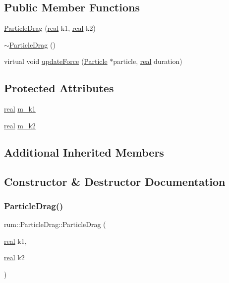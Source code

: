 \subsection*{Public Member Functions}
\begin{DoxyCompactItemize}
\item 
\hyperlink{classrum_1_1_particle_drag_a8489f5c5deb622003656afc4989e71bb}{Particle\+Drag} (\hyperlink{namespacerum_a7e8cca23573d5eaead0f138cbaa4862c}{real} k1, \hyperlink{namespacerum_a7e8cca23573d5eaead0f138cbaa4862c}{real} k2)
\item 
\hyperlink{classrum_1_1_particle_drag_a21072ca38b82529540f361a24cbec508}{$\sim$\+Particle\+Drag} ()
\item 
virtual void \hyperlink{classrum_1_1_particle_drag_ae7fd35504197fc262b2af02da80c148e}{update\+Force} (\hyperlink{classrum_1_1_particle}{Particle} $\ast$particle, \hyperlink{namespacerum_a7e8cca23573d5eaead0f138cbaa4862c}{real} duration)
\end{DoxyCompactItemize}
\subsection*{Protected Attributes}
\begin{DoxyCompactItemize}
\item 
\hyperlink{namespacerum_a7e8cca23573d5eaead0f138cbaa4862c}{real} \hyperlink{classrum_1_1_particle_drag_ad4fcf721667ea70b2ee8ca5ddac9d0ed}{m\+\_\+k1}
\item 
\hyperlink{namespacerum_a7e8cca23573d5eaead0f138cbaa4862c}{real} \hyperlink{classrum_1_1_particle_drag_a30f863703e55b68316c64c6f9a8cc25f}{m\+\_\+k2}
\end{DoxyCompactItemize}
\subsection*{Additional Inherited Members}


\subsection{Constructor \& Destructor Documentation}
\mbox{\label{classrum_1_1_particle_drag_a8489f5c5deb622003656afc4989e71bb}} 
\subsubsection{\texorpdfstring{Particle\+Drag()}{ParticleDrag()}}
{\footnotesize\ttfamily rum\+::\+Particle\+Drag\+::\+Particle\+Drag (\begin{DoxyParamCaption}\item[{\hyperlink{namespacerum_a7e8cca23573d5eaead0f138cbaa4862c}{real}}]{k1,  }\item[{\hyperlink{namespacerum_a7e8cca23573d5eaead0f138cbaa4862c}{real}}]{k2 }\end{DoxyParamCaption})}

